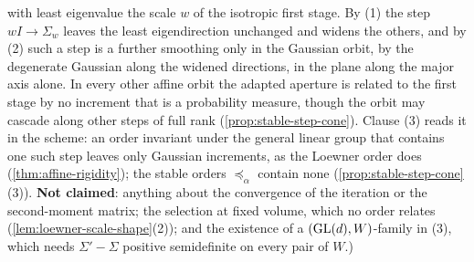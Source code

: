 \begin{proposition}
{with least eigenvalue the scale $w$ of the isotropic first stage. By (1) the step $wI \to \Sigma_w$
leaves the least eigendirection unchanged and widens the others, and by (2) such a step is a further
smoothing only in the Gaussian orbit, by the degenerate Gaussian along the widened directions, in the
plane along the major axis alone. In every other affine orbit the adapted aperture is related to the first
stage by no increment that is a probability measure, though the orbit may cascade along other steps of
full rank (\ref{prop:stable-step-cone}). Clause (3) reads it in the scheme: an order invariant under the
general linear group that contains one such step leaves only Gaussian increments, as the Loewner order
does (\ref{thm:affine-rigidity}); the stable orders $\preceq_\alpha$ contain none
(\ref{prop:stable-step-cone}(3)). \textbf{Not claimed}: anything about the convergence of the iteration or
the second-moment matrix; the selection at fixed volume, which no order relates
(\ref{lem:loewner-scale-shape}(2)); and the existence of a $(\mathrm{GL}(d), W)$-family in (3), which needs
$\Sigma' - \Sigma$ positive semidefinite on every pair of $W$.)}
\end{proposition}

